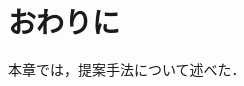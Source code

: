 \documentclass[../main]{subfiles}
\begin{document}
\section{おわりに}
\label{sec:pmethod_conclusion}

本章では，提案手法について述べた．
\end{document}
